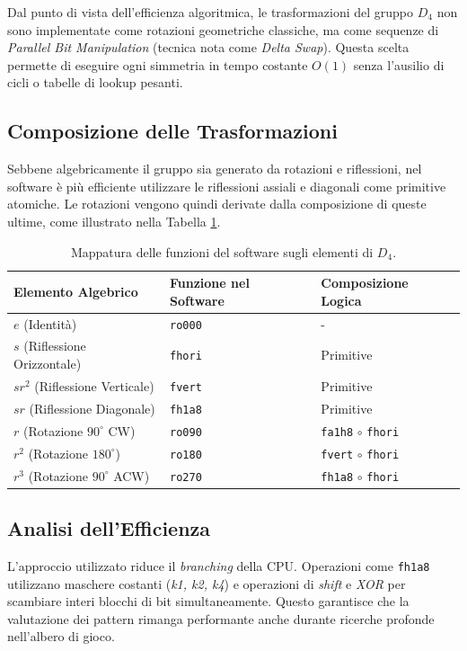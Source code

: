 Dal punto di vista dell'efficienza algoritmica, le trasformazioni del gruppo $D_4$ non sono implementate come rotazioni geometriche classiche, ma come sequenze di \textit{Parallel Bit Manipulation} (tecnica nota come \textit{Delta Swap}). Questa scelta permette di eseguire ogni simmetria in tempo costante $O(1)$ senza l'ausilio di cicli o tabelle di lookup pesanti.

\subsection{Composizione delle Trasformazioni}
Sebbene algebricamente il gruppo sia generato da rotazioni e riflessioni, nel software è più efficiente utilizzare le riflessioni assiali e diagonali come primitive atomiche. Le rotazioni vengono quindi derivate dalla composizione di queste ultime, come illustrato nella Tabella \ref{tab:code_mapping}.

\begin{table}[h]
\centering
\caption{Mappatura delle funzioni del software sugli elementi di $D_4$.}
\label{tab:code_mapping}
\begin{tabular}{lll}
\hline
\textbf{Elemento Algebrico} & \textbf{Funzione nel Software} & \textbf{Composizione Logica} \\ \hline
$e$ (Identità) & \texttt{ro000} & - \\
$s$ (Riflessione Orizzontale) & \texttt{fhori} & Primitive \\
$sr^2$ (Riflessione Verticale) & \texttt{fvert} & Primitive \\
$sr$ (Riflessione Diagonale) & \texttt{fh1a8} & Primitive \\
$r$ (Rotazione $90^\circ$ CW) & \texttt{ro090} & \texttt{fa1h8} $\circ$ \texttt{fhori} \\
$r^2$ (Rotazione $180^\circ$) & \texttt{ro180} & \texttt{fvert} $\circ$ \texttt{fhori} \\
$r^3$ (Rotazione $90^\circ$ ACW) & \texttt{ro270} & \texttt{fh1a8} $\circ$ \texttt{fhori} \\ \hline
\end{tabular}
\end{table}

\subsection{Analisi dell'Efficienza}
L'approccio utilizzato riduce il \textit{branching} della CPU.
Operazioni come \texttt{fh1a8} utilizzano maschere costanti (\textit{k1, k2, k4}) e operazioni
di \textit{shift} e \textit{XOR} per scambiare interi blocchi di bit simultaneamente.
Questo garantisce che la valutazione dei pattern rimanga performante anche durante ricerche profonde nell'albero di gioco.
